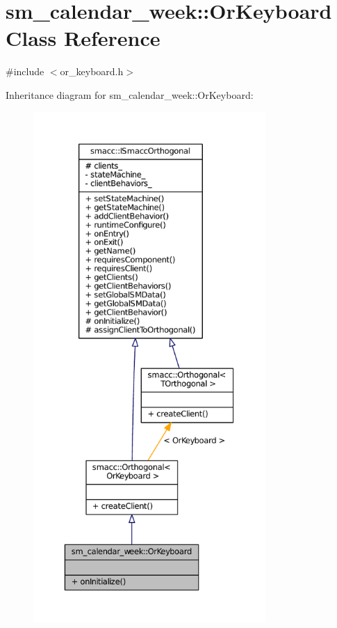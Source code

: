 \hypertarget{classsm__calendar__week_1_1OrKeyboard}{}\section{sm\+\_\+calendar\+\_\+week\+:\+:Or\+Keyboard Class Reference}
\label{classsm__calendar__week_1_1OrKeyboard}


{\ttfamily \#include $<$or\+\_\+keyboard.\+h$>$}



Inheritance diagram for sm\+\_\+calendar\+\_\+week\+:\+:Or\+Keyboard\+:
\nopagebreak
\begin{figure}[H]
\begin{center}
\leavevmode
\includegraphics[height=550pt]{classsm__calendar__week_1_1OrKeyboard__inherit__graph}
\end{center}
\end{figure}


